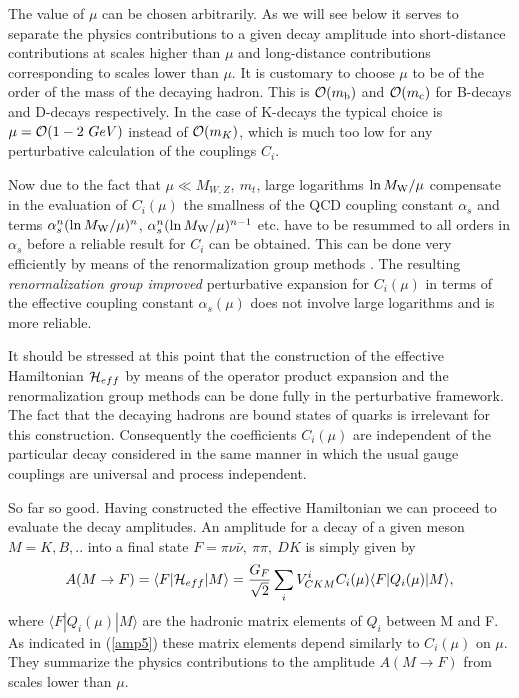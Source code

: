 \documentclass[12pt,rotate]{article}
\newcommand{\mc}{m_{\rm c}}
\newcommand{\mb}{m_{\rm b}}
\newcommand{\mw}{M_{\rm W}}
\newcommand{\be}{\begin{equation}}
\newcommand{\ee}{\end{equation}}
\newcommand{\ord}{{\cal O}}
\begin{document}
The value of $\mu$ can be chosen arbitrarily. As we will see below it serves 
to separate the physics contributions to a given decay amplitude into
short-distance contributions at scales higher than $\mu$ and long-distance
contributions corresponding to scales lower than $\mu$. It is customary 
to choose
$\mu$ to be of the order of the mass of the decaying hadron. 
This is $\ord (\mb)$ and $\ord(\mc)$ for B-decays and
D-decays respectively. In the case of K-decays the typical choice is
 $\mu=\ord(1-2~GeV)$
instead of $\ord(m_K)$, which is much too low for any perturbative 
calculation of the couplings $C_i$.

Now due to the fact that $\mu\ll  M_{W,Z},~ m_t$, large logarithms 
$\ln\mw/\mu$ compensate in the evaluation of
$C_i(\mu)$ the smallness of the QCD coupling constant $\alpha_s$ and 
terms $\alpha^n_s (\ln\mw/\mu)^n$, $\alpha^n_s (\ln\mw/\mu)^{n-1}$ 
etc. have to be resummed to all orders in $\alpha_s$ before a reliable 
result for $C_i$ can be obtained.
This can be done very efficiently by means of the renormalization group
methods \cite{REGM,HV1,Weinberg}. 
The resulting {\it renormalization group improved} perturbative
expansion for $C_i(\mu)$ in terms of the effective coupling constant 
$\alpha_s(\mu)$ does not involve large logarithms and is more reliable.

It should be stressed at this point that the construction of the effective
Hamiltonian ${\cal H}_{eff}$ by means of the operator product expansion and 
the
renormalization group methods can be done fully in the perturbative framework.
The fact that the decaying hadrons are bound states of quarks is irrelevant
for this construction. Consequently the coefficients $C_i(\mu)$ are 
independent of the
particular decay considered in the same manner in which the usual gauge
couplings are universal and process independent.

So far so good. Having constructed the effective Hamiltonian we can proceed
to evaluate the decay amplitudes. An amplitude for a decay of a given meson 
$M= K, B,..$ into a final state $F=\pi\nu\bar\nu,~\pi\pi,~DK$ is simply 
given by
\be\label{amp5}
A(M\to F)=\langle F|{\cal H}_{eff}|M\rangle
=\frac{G_F}{\sqrt{2}}\sum_i V^i_{CKM}C_i(\mu)\langle F|Q_i(\mu)|M\rangle,
\ee
where $\langle F|Q_i(\mu)|M\rangle$ 
are the hadronic matrix elements of $Q_i$ between M and F. As indicated
in (\ref{amp5}) these matrix elements depend similarly to $C_i(\mu)$ 
on $\mu$. They summarize the physics contributions to the amplitude 
$A(M\to F)$ from scales lower than $\mu$.
\end{document}
